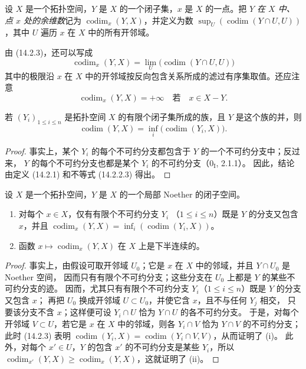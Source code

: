 \begin{definition}[14.2.4]
\label{0.14.2.4-fr}
设 $X$ 是一个拓扑空间，$Y$ 是 $X$ 的一个闭子集，$x$ 是 $X$ 的一点。把
\emph{$Y$ 在 $X$ 中、点 $x$ 处的余维数}记为 $\operatorname{codim}_x(Y,X)$，并定义为数
$\sup_U(\operatorname{codim}(Y\cap U,U))$，其中 $U$ 遍历 $x$ 在 $X$ 中的所有开邻域。
\end{definition}

由 (14.2.3)，还可以写成
\[
  \operatorname{codim}_x(Y,X)=
  \lim_U\bigl(\operatorname{codim}(Y\cap U,U)\bigr)
  \tag{14.2.4.1}\label{0.14.2.4.1-fr}
\]
其中的极限沿 $x$ 在 $X$ 中的开邻域按反向包含关系所成的滤过有序集取值。还应注意
\[
  \operatorname{codim}_x(Y,X)=+\infty\quad\text{若}\quad x\in X-Y.
\]


\begin{proposition}[14.2.5]
\label{0.14.2.5-fr}
若 $(Y_i)_{1\leq i\leq n}$ 是拓扑空间 $X$ 的有限个闭子集所成的族，且 $Y$ 是这个族的并，则
\[
  \operatorname{codim}(Y,X)=
  \inf_i\bigl(\operatorname{codim}(Y_i,X)\bigr).
  \tag{14.2.5.1}\label{0.14.2.5.1-fr}
\]
\end{proposition}

\begin{proof}
事实上，某个 $Y_i$ 的每个不可约分支都包含于 $Y$ 的一个不可约分支中；反过来，
$Y$ 的每个不可约分支也都是某个 $Y_i$ 的不可约分支（$0_{\mathrm I}$, 2.1.1）。
因此，结论由定义 (14.2.1) 和不等式 (14.2.2.3) 得出。
\end{proof}

\begin{corollary}[14.2.6]
\label{0.14.2.6-fr}
设 $X$ 是一个拓扑空间，$Y$ 是 $X$ 的一个局部 Noether 的闭子空间。
\begin{enumerate}
  \item[\rm(i)] 对每个 $x\in X$，仅有有限个不可约分支 $Y_i$
  （$1\leq i\leq n$）既是 $Y$ 的分支又包含 $x$，并且
  $\operatorname{codim}_x(Y,X)=
  \inf_i(\operatorname{codim}(Y_i,X))$。
  \item[\rm(ii)] 函数
  $x\mapsto\operatorname{codim}_x(Y,X)$ 在 $X$ 上是下半连续的。
\end{enumerate}
\end{corollary}

\begin{proof}
事实上，由假设可取开邻域 $U_0$；它是 $x$ 在 $X$ 中的邻域，并且 $Y\cap U_0$ 是 Noether 空间，
因而只有有限个不可约分支；这些分支在 $U_0$ 上都是 $Y$ 的某些不可约分支的迹。
因而，尤其只有有限个不可约分支 $Y_i$（$1\leq i\leq n$）既是 $Y$ 的分支又包含 $x$；
再把 $U_0$ 换成开邻域 $U\subset U_0$，并使它含 $x$，且不与任何 $Y_j$ 相交，
只要该分支不含 $x$；这样便可设 $Y_i\cap U$ 恰为 $Y\cap U$ 的各不可约分支。
于是，对每个开邻域 $V\subset U$，若它是 $x$ 在 $X$ 中的邻域，则各 $Y_i\cap V$ 恰为 $Y\cap V$
的不可约分支；此时 (14.2.3) 表明
$\operatorname{codim}(Y_i,X)=\operatorname{codim}(Y_i\cap V,V)$，从而证明了 (i)。
此外，对每个 $x'\in U$，$Y$ 的包含 $x'$ 的不可约分支是某些 $Y_i$，所以
$\operatorname{codim}_{x'}(Y,X)\geq\operatorname{codim}_x(Y,X)$，这就证明了 (ii)。
\end{proof}

